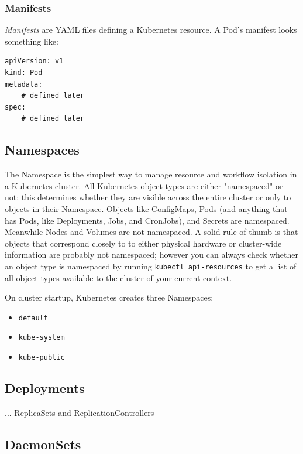 \documentclass[11pt, a4paper]{article}
\begin{document}
\subsubsection{Manifests}

\textit{Manifests} are YAML files defining a Kubernetes resource. A Pod's manifest looks something like:

\begin{lstlisting}
apiVersion: v1
kind: Pod
metadata:
	# defined later
spec:
	# defined later
\end{lstlisting}

\subsection{Namespaces}

The Namespace is the simplest way to manage resource and workflow isolation in a Kubernetes cluster. All Kubernetes object types are either "namespaced" or not; this determines whether they are visible across the entire cluster or only to objects in their Namespace. Objects like ConfigMaps, Pods (and anything that has Pods, like Deployments, Jobs, and CronJobs), and Secrets are namespaced. Meanwhile Nodes and Volumes are not namespaced. A solid rule of thumb is that objects that correspond closely to to either physical hardware or cluster-wide information are probably not namespaced; however you can always check whether an object type is namespaced by running \texttt{kubectl api-resources} to get a list of all object types available to the cluster of your current context.

On cluster startup, Kubernetes creates three Namespaces:

\begin{itemize}
\item \texttt{default}
\item \texttt{kube-system}
\item \texttt{kube-public}
\end{itemize}

\subsection{Deployments}

... ReplicaSets and ReplicationControllers 

\subsection{DaemonSets}
\end{document}
